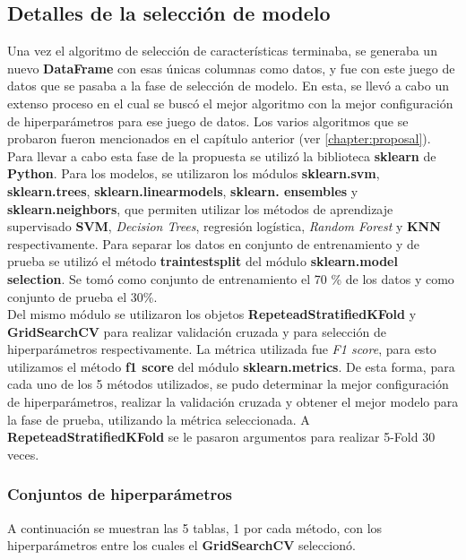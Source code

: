 	\subsection{Detalles de la selección de modelo}
		Una vez el algoritmo de selección de características terminaba, se generaba un nuevo \textbf{DataFrame} con esas únicas columnas como datos,
		y fue con este juego de datos que se pasaba a la fase de selección de modelo. En esta, se llevó a cabo un extenso proceso en el cual se buscó
		el mejor algoritmo con la mejor configuración de hiperparámetros para ese juego de datos. Los varios algoritmos que se probaron fueron
		mencionados en el capítulo anterior (ver \ref {chapter:proposal}).\\
		\indent Para llevar a cabo esta fase de la propuesta se utilizó la biblioteca \textbf{sklearn} de \textbf{Python}.
		Para los modelos, se utilizaron los módulos \textbf{sklearn.svm}, \textbf{sklearn.trees}, \textbf{sklearn.linear\textunderscore models},
		\textbf{sklearn. ensembles} y \textbf{sklearn.neighbors}, que permiten utilizar los métodos de aprendizaje supervisado \textbf{SVM}, \emph
		{Decision Trees}, regresión logística, \emph{Random Forest} y \textbf{KNN} respectivamente. Para separar los datos en conjunto de entrenamiento
		y de prueba se utilizó el método \textbf{train\textunderscore test\textunderscore split} del módulo \textbf{sklearn.model\textunderscore
		selection}. Se tomó como  conjunto de entrenamiento el 70 \% de los datos y como conjunto de prueba el 30\%.\\
		\indent Del mismo módulo se utilizaron los objetos \textbf {RepeteadStratifiedKFold} y \textbf{GridSearchCV} para realizar validación cruzada y
		para selección de hiperparámetros respectivamente. La métrica utilizada fue \emph{F1 score}, para esto utilizamos el método \textbf{f1\textunderscore
		score} del módulo \textbf{sklearn.metrics}. De esta forma, para cada uno de los 5 métodos utilizados, se pudo determinar la mejor configuración
		de hiperparámetros, realizar la validación cruzada y obtener el mejor modelo para la fase de prueba, utilizando la métrica seleccionada. A \textbf{
		RepeteadStratifiedKFold} se le pasaron argumentos para realizar 5-Fold 30 veces.

		\subsubsection{Conjuntos de hiperparámetros}
			A continuación se muestran las 5 tablas, 1 por cada método, con los hiperparámetros entre los cuales el \textbf{GridSearchCV} seleccionó.\\

